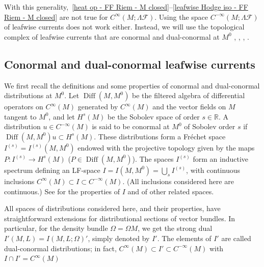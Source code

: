 \documentclass{memo-l}
\theoremstyle{plain}
\theoremstyle{definition}
\theoremstyle{remark}
\newcommand{\R}{\mathbb{R}}
\newcommand{\FF}{\mathcal{F}}
\newcommand{\Diff}{\operatorname{Diff}}
\numberwithin{section}{chapter}
\numberwithin{equation}{section}%
\begin{document}
With this generality,~\eqref{heat op - FF Riem - M closed}--\eqref{leafwise Hodge iso - FF Riem - M closed} are not true for $C^\infty(M;\Lambda\FF)$. Using the space $C^{-\infty}(M;\Lambda\FF)$ of leafwise currents does not work either. Instead, we will use the topological complex of leafwise currents that are conormal and dual-conormal at $M^0$ \cite{KohnNirenberg1965,Hormander1971}, \cite[Section~18.2]{Hormander1985-III}, \cite[Chapters~4 and~6]{Melrose1996}, \cite{AlvKordyLeichtnam-conormal}.


\subsection{Conormal and dual-conormal leafwise currents}
\label{ss: general - conormal and dual-conormal leafwise currents}

We first recall the definitions and some properties of conormal and dual-conormal distributions at $M^0$. Let $\Diff(M,M^0)$ be the filtered algebra of differential operators on $C^\infty(M)$ generated by $C^\infty(M)$ and the vector fields on $M$ tangent to $M^0$, and let $H^s(M)$ be the Sobolev space of order $s\in\R$. A distribution $u\in C^{-\infty}(M)$ is said to be conormal at $M^0$ of Sobolev order $s$ if $\Diff(M,M^0)u\subset H^s(M)$. These distributions form a Fr\'echet space $I^{(s)}=I^{(s)}(M,M^0)$ endowed with the projective topology given by the maps $P:I^{(s)}\to H^s(M)$ ($P\in\Diff(M,M^0)$). The spaces $I^{(s)}$ form an inductive spectrum defining an LF-space $I=I(M,M^0)=\bigcup_sI^{(s)}$, with continuous inclusions $C^\infty(M)\subset I\subset C^{-\infty}(M)$. (All inclusions considered here are continuous.) See \cite{AlvKordyLeichtnam-conormal} for the properties of $I$ and of other related spaces.

All spaces of distributions considered here, and their properties, have straightforward extensions for distributional sections of vector bundles.  In particular, for the density bundle $\Omega=\Omega M$, we get the strong dual $I'(M,L)=I(M,L;\Omega)'$, simply denoted by $I'$. The elements of $I'$ are called dual-conormal distributions; in fact, $C^\infty(M)\subset I'\subset C^{-\infty}(M)$ with $I\cap I'=C^\infty(M)$
\end{document}
